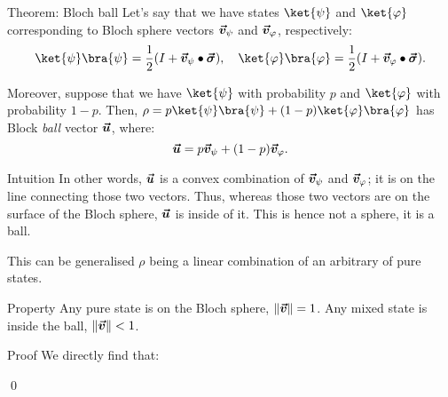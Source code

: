 \documentclass[a4paper]{article}
\begin{document}
\begin{parag}{Theorem: Bloch ball}
    Let's say that we have states $\ket{\psi}$ and $\ket{\phi}$ corresponding to Bloch sphere vectors $\bm{\protect\vec{v}}_{\psi}$ and $\bm{\protect\vec{v}}_{\varphi}$, respectively: 
    \[\ket{\psi}\bra{\psi} = \frac{1}{2} \left(I + \bvec{v}_{\psi} \dotprod \bvec{\sigma}\right), \mathspace \ket{\phi}\bra{\phi} = \frac{1}{2} \left(I + \bvec{v}_{\phi} \dotprod \bvec{\sigma}\right).\]

    Moreover, suppose that we have $\ket{\psi}$ with probability $p$ and $\ket{\phi}$ with probability $1 - p$. Then, $\rho = p \ket{\psi}\bra{\psi} + \left(1-p\right) \ket{\phi}\bra{\phi}$ has Block \textit{ball} vector $\bm{\protect\vec{u}}$, where: 
    \[\bvec{u} = p \bvec{v}_{\psi} + \left(1 - p\right) \bvec{v}_{\phi}.\]

    \begin{subparag}{Intuition}
        In other words, $\bm{\protect\vec{u}}$ is a convex combination of $\bm{\protect\vec{v}}_{\psi}$ and $\bm{\protect\vec{v}}_{\varphi}$; it is on the line connecting those two vectors. Thus, whereas those two vectors are on the surface of the Bloch sphere, $\bm{\protect\vec{u}}$ is inside of it. This is hence not a sphere, it is a ball.

        This can be generalised $\rho$ being a linear combination of an arbitrary of pure states.
    \end{subparag}
    
    \begin{subparag}{Property}
        Any pure state is on the Bloch sphere, $\left\|\bvec{v}\right\| = 1$. Any mixed state is inside the ball, $\left\|\bvec{v}\right\| < 1$.
    \end{subparag}

    \begin{subparag}{Proof}
        We directly find that: 
        
        \qed
    \end{subparag}
\end{parag}
\end{document}
